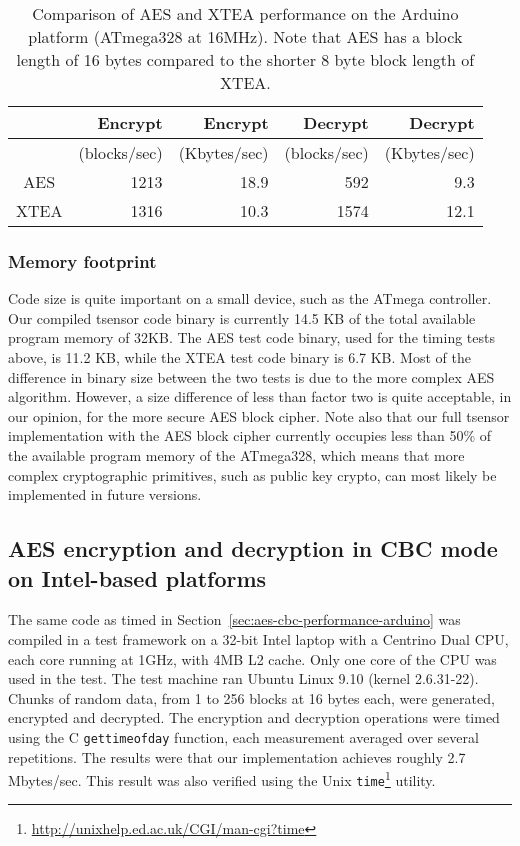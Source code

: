 \begin{table}[h]
\begin{center}
\begin{tabular}{|c|r|r|r|r|}
\hline  & Encrypt & Encrypt & Decrypt & Decrypt \\
\hline  & (blocks/sec) & (Kbytes/sec) & (blocks/sec) & (Kbytes/sec) \\ 
\hline AES & 1213 & 18.9 & 592 & 9.3 \\ 
\hline XTEA & 1316 & 10.3 & 1574 & 12.1 \\ 
\hline 
\end{tabular}
\end{center}
\caption{Comparison of AES and XTEA performance on the Arduino platform (ATmega328 at 16MHz). Note that AES has a block length of 16 bytes compared to the shorter 8 byte block length of XTEA.}
\label{tab:aes-xtea-comparison}
\end{table} 

\subsubsection*{Memory footprint}

Code size is quite important on a small device, such as the ATmega controller. Our compiled tsensor code binary is currently 14.5 KB of the total available program memory of 32KB. The AES test code binary, used for the timing tests above, is 11.2 KB, while the XTEA test code binary is 6.7 KB. Most of the difference in binary size between the two tests is due to the more complex AES algorithm. However, a size difference of less than factor two is quite acceptable, in our opinion, for the more secure AES block cipher. Note also that our full tsensor implementation with the AES block cipher currently occupies less than 50\% of the available program memory of the ATmega328, which means that more complex cryptographic primitives, such as public key crypto, can most likely be implemented in future versions.

\subsection{AES encryption and decryption in CBC mode on Intel-based platforms}

The same code as timed in Section~\ref{sec:aes-cbc-performance-arduino} was compiled in a test framework on a 32-bit Intel laptop with a Centrino Dual CPU, each core running at 1GHz, with 4MB L2 cache. Only one core of the CPU was used in the test. The test machine ran Ubuntu Linux 9.10 (kernel 2.6.31-22). Chunks of random data, from 1 to 256 blocks at 16 bytes each, were generated, encrypted and decrypted. The encryption and decryption operations were timed using the C \texttt{gettimeofday} function, each measurement averaged over several repetitions. The results were that our implementation achieves roughly 2.7 Mbytes/sec. This result was also verified using the Unix \texttt{time}\footnote{\url{http://unixhelp.ed.ac.uk/CGI/man-cgi?time}} utility.

